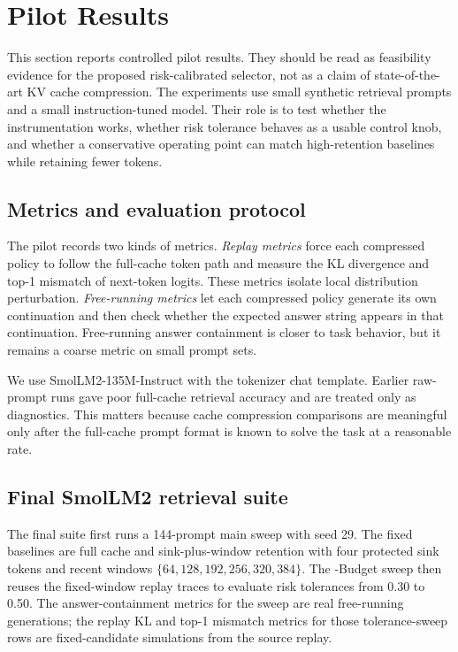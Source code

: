 \section{Pilot Results}
\label{sec:pilot-results}

This section reports controlled pilot results. They should be read as feasibility evidence for the proposed risk-calibrated selector, not as a claim of state-of-the-art KV cache compression. The experiments use small synthetic retrieval prompts and a small instruction-tuned model. Their role is to test whether the instrumentation works, whether risk tolerance behaves as a usable control knob, and whether a conservative \uckv{} operating point can match high-retention baselines while retaining fewer tokens.

\subsection{Metrics and evaluation protocol}

The pilot records two kinds of metrics. \emph{Replay metrics} force each compressed policy to follow the full-cache token path and measure the KL divergence and top-1 mismatch of next-token logits. These metrics isolate local distribution perturbation. \emph{Free-running metrics} let each compressed policy generate its own continuation and then check whether the expected answer string appears in that continuation. Free-running answer containment is closer to task behavior, but it remains a coarse metric on small prompt sets.

We use SmolLM2-135M-Instruct with the tokenizer chat template. Earlier raw-prompt runs gave poor full-cache retrieval accuracy and are treated only as diagnostics. This matters because cache compression comparisons are meaningful only after the full-cache prompt format is known to solve the task at a reasonable rate.

\subsection{Final SmolLM2 retrieval suite}

The final suite first runs a 144-prompt main sweep with seed 29. The fixed baselines are full cache and sink-plus-window retention with four protected sink tokens and recent windows $\{64,128,192,\allowbreak 256,320,384\}$. The \uckv{}-Budget sweep then reuses the fixed-window replay traces to evaluate risk tolerances from 0.30 to 0.50. The answer-containment metrics for the \uckv{} sweep are real free-running generations; the replay KL and top-1 mismatch metrics for those tolerance-sweep rows are fixed-candidate simulations from the source replay.

